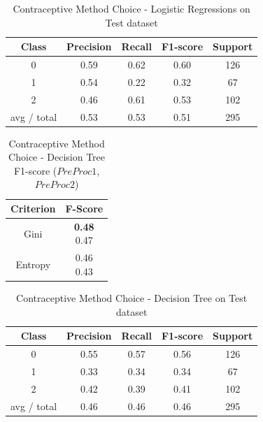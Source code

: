 \begin{table}[p]
\begin{center}
\begin{tabular}{|c|c|c|c|c|}
\hline Class & Precision & Recall & F1-score & Support \\

\hline 0 & 0.59 & 0.62 & 0.60 & 126\\
\hline 1 & 0.54 & 0.22 & 0.32 & 67\\
\hline 2 & 0.46 & 0.61 & 0.53 & 102\\
\hline avg / total & 0.53 & 0.53 & 0.51 & 295\\
\hline
\end{tabular}

\caption{Contraceptive Method Choice - Logistic Regressions on Test dataset}
\label{ds1:table:logisticregression-test}
\end{center}
\end{table}

\begin{table}[p]
\begin{center}
\begin{tabular}{|c|c|}
\hline Criterion & F-Score \\

\hline Gini & \minibox{\textbf{0.48}\\ 0.47} \\

\hline Entropy & \minibox{0.46\\ 0.43} \\

\hline
\end{tabular}

\caption{Contraceptive Method Choice - Decision Tree F1-score ($PreProc1$, $PreProc2$)}
\label{ds1:table:decisiontree}
\end{center}
\end{table}


\begin{table}[p]
\begin{center}
\begin{tabular}{|c|c|c|c|c|}
\hline Class & Precision & Recall & F1-score & Support \\

\hline 0 & 0.55 & 0.57 & 0.56 & 126\\
\hline 1 & 0.33 & 0.34 & 0.34 & 67\\
\hline 2 & 0.42 & 0.39 & 0.41 & 102\\
\hline avg / total & 0.46 & 0.46 & 0.46 & 295\\
\hline
\end{tabular}

\caption{Contraceptive Method Choice - Decision Tree on Test dataset}
\label{ds1:table:decisiontree-test}
\end{center}
\end{table}


